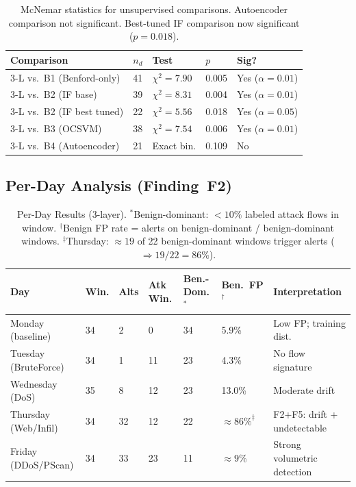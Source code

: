\documentclass[journal,10pt,twoside]{IEEEtran}
\begin{document}
\begin{table}[t]
\caption{McNemar statistics for unsupervised comparisons.
  Autoencoder comparison not significant.  Best-tuned IF comparison
  now significant ($p{=}0.018$).}
\label{tab:mcnemar}
\centering\small
\begin{tabular}{@{}L{3.1cm}P{0.7cm}L{1.05cm}P{0.65cm}P{1.1cm}@{}}
\toprule
\textbf{Comparison} & $n_d$ & \textbf{Test} & $p$ & \textbf{Sig?} \\
-L vs.\ B1 (Benford-only)
  & 41 & $\chi^2{=}7.90$ & 0.005 & Yes ($\alpha{=}0.01$) \\
3-L vs.\ B2 (IF base)
  & 39 & $\chi^2{=}8.31$ & 0.004 & Yes ($\alpha{=}0.01$) \\
3-L vs.\ B2 (IF best tuned)
  & 22 & $\chi^2{=}5.56$ & 0.018 & Yes ($\alpha{=}0.05$) \\
3-L vs.\ B3 (OCSVM)
  & 38 & $\chi^2{=}7.54$ & 0.006 & Yes ($\alpha{=}0.01$) \\
3-L vs.\ B4 (Autoencoder)
  & 21 & Exact bin.      & 0.109 & No \\
\bottomrule
\end{tabular}
\end{table}

\subsection{Per-Day Analysis (Finding~F2)}

\begin{table}[t]
\caption{Per-Day Results (3-layer).
  $^{*}$Benign-dominant: ${<}10\%$ labeled attack flows in window.
  $^{\dagger}$Benign FP rate = alerts on benign-dominant /
  benign-dominant windows.
  $^{\ddagger}$Thursday: ${\approx}19$ of 22 benign-dominant
  windows trigger alerts ($\Rightarrow 19/22{=}86\%$).}
\label{tab:perday}
\centering\small
\begin{tabular}{@{}L{2.25cm}P{0.65cm}P{0.7cm}P{0.95cm}P{1.15cm}
                   P{1.15cm}L{3.1cm}@{}}
\toprule
\textbf{Day} & \textbf{Win.} & \textbf{Alts}
  & \textbf{Atk Win.} & \textbf{Ben.-Dom.$^{*}$}
  & \textbf{Ben.\ FP$^{\dagger}$} & \textbf{Interpretation} \\
\midrule
Monday (baseline)      & 34 &  2 &  0 & 34
  & 5.9\%               & Low FP; training dist. \\
Tuesday (BruteForce)   & 34 &  1 & 11 & 23
  & 4.3\%               & No flow signature \\
Wednesday (DoS)        & 35 &  8 & 12 & 23
  & 13.0\%              & Moderate drift \\
Thursday (Web/Infil)   & 34 & 32 & 12 & 22
  & ${\approx}86\%^{\ddagger}$ & F2+F5: drift + undetectable \\
Friday (DDoS/PScan)    & 34 & 33 & 23 & 11
  & ${\approx}9\%$      & Strong volumetric detection \\
\bottomrule
\end{tabular}
\end{table}
\end{document}
